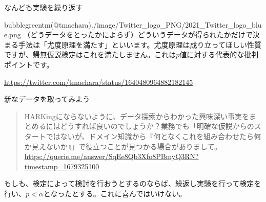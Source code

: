 \begin{SMbox}{なんども実験を繰り返す}
\begin{rightbubbles}{bubblegreen}{tm(@tmaehara)}{./image/Twitter_logo_PNG/2021_Twitter_logo_blue.png}
  （どうデータをとったかによらず）どういうデータが得られたかだけで決まる手法は「尤度原理を満たす」といいます。尤度原理は成り立ってほしい性質ですが、帰無仮説検定はこれを満たしません。これは$p$値に対する代表的な批判ポイントです。
\begin{flushright} 
\small	\url{https://twitter.com/tmaehara/status/1640480964882182145}
\end{flushright}    
\end{rightbubbles}


\end{SMbox}

\begin{SMbox}{新なデータを取ってみよう}
  \begin{quote}
    HARKingにならないように、データ探索からわかった興味深い事実をまとめるにはどうすれば良いのでしょうか？業務でも「明確な仮説からのスタートではないが、ドメイン知識から『何となくこれを組み合わせたら何か見えないか』」で役立つことが見つかる場合がありまして。
\\ \url{https://querie.me/answer/SqEe8Qb3Xfo8PBmyQ3RN?timestamp=1679325100}
  \end{quote}
  もしも、検定によって検討を行おうとするのならば、繰返し実験を行って検定を行い、$p<\alpha$となったとする。これに喜んではいけない。
\end{SMbox}



